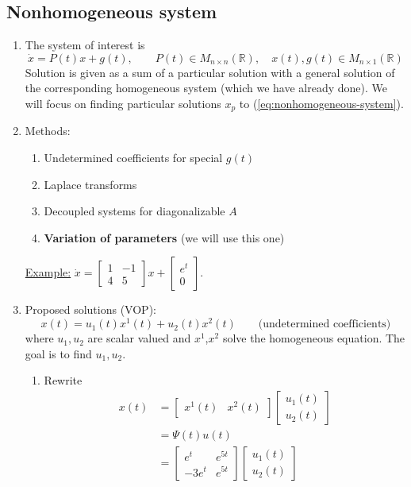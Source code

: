 \documentclass[11pt, letterpaper, oneside]{article}     %
\numberwithin{equation}{subsection}
\theoremstyle{definition}
\numberwithin{theorem}{section}
\theoremstyle{remark}
\newcommand{\RR}{\mathbb{R}}
\begin{document}
\subsection{Nonhomogeneous system}
\begin{enumerate}
  \item The system of interest is
  \begin{equation}\label{eq:nonhomogeneous-system}
    \dot x = P(t)x + g(t),\quad\quad P(t) \in M_{n\times n}(\RR),\quad x(t),g(t) \in M_{n\times 1}(\RR)
  \end{equation}
  Solution is given as a sum of a particular solution with a general solution of the corresponding homogeneous system (which we have already done). We will focus on finding particular solutions $x_p$ to (\ref{eq:nonhomogeneous-system}).

\item Methods:
  \begin{enumerate}
  \item Undetermined coefficients for special $g(t)$
  \item Laplace transforms
  \item Decoupled systems for diagonalizable $A$
  \item \textbf{Variation of parameters} (we will use this one)
  \end{enumerate}

  \underline{Example:}
  $\dot x = \begin{bmatrix} 1 & -1 \\ 4 & 5\end{bmatrix}x + \begin{bmatrix} e^t \\ 0 \end{bmatrix}$.

\item
  Proposed solutions (VOP):
  \begin{equation}
    x(t) = u_1(t)x^1(t) + u_2(t)x^2(t) \quad\quad\text{(undetermined coefficients)}
  \end{equation}
  where $u_1,u_2$ are scalar valued and $x^1$,$x^2$ solve the homogeneous equation. The goal is to find $u_1,u_2$.
  \begin{enumerate}
  \item Rewrite
    \begin{align}
      x(t) &=
      \begin{bmatrix}
        x^1(t) & x^2(t)
      \end{bmatrix}
      \begin{bmatrix}
        u_1(t) \\ u_2(t)
      \end{bmatrix}\\
      &= \Psi(t)u(t)\\
      &=
      \begin{bmatrix}
        e^t & e^{5t}\\
        -3e^t & e^{5t}
      \end{bmatrix}
      \begin{bmatrix}
        u_1(t) \\ u_2(t)
      \end{bmatrix}
    \end{align}


\end{enumerate}
\end{enumerate}
\end{document}
